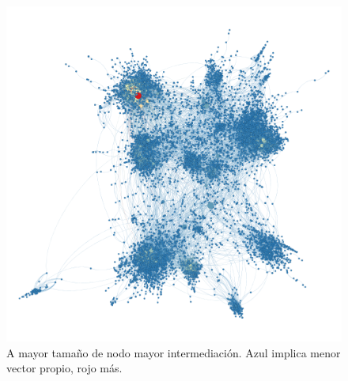 \begin{figure}[ht]
    \centerfloat
    \includegraphics[width=1.3\textwidth]{img/resultados/intermediacion-vectorPropio.png}
    \caption{A mayor tamaño de nodo mayor intermediación. Azul implica menor vector propio, rojo más.}
\end{figure}